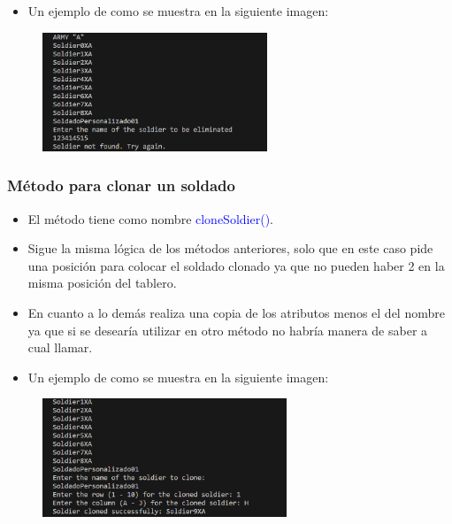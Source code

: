 \documentclass{article}
\begin{document}
\begin{itemize}\begin{itemize}\item Un ejemplo de como se muestra en la siguiente imagen:
\end{itemize}\end{itemize}
\begin{figure}[H]
    \centering
    \includegraphics[width=0.6\textwidth,keepaspectratio]{img/12deleteSoldier.png}
    \caption{}
\end{figure}



\subsubsection{Método para clonar un soldado}
\begin{itemize}
    \item El método tiene como nombre \textcolor{blue}{cloneSoldier()}.
    \item Sigue la misma lógica de los métodos anteriores, solo que en este caso pide una posición para colocar el soldado clonado ya que no pueden haber 2 en la misma posición del tablero.
    \item En cuanto a lo demás realiza una copia de los atributos menos el del nombre ya que si se desearía utilizar en otro método no habría manera de saber a cual llamar.
\end{itemize}


\newpage

\begin{itemize}\begin{itemize}\item Un ejemplo de como se muestra en la siguiente imagen:
\end{itemize}\end{itemize}
\begin{figure}[H]
    \centering
    \includegraphics[width=0.65\textwidth,keepaspectratio]{img/12cloneSoldier.png}
    \caption{}
\end{figure}
\end{document}
